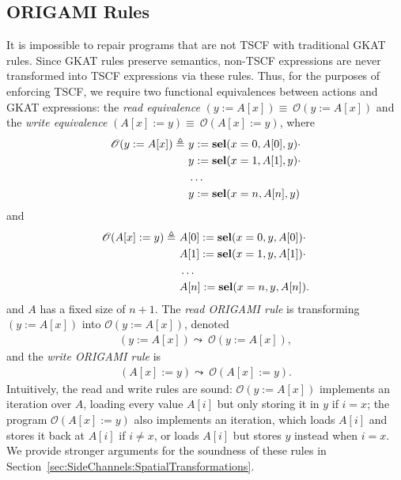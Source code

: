 \subsection{ORIGAMI Rules}
\label{sec:SideChannels:OrigamiRules}
It is impossible to repair programs that are not TSCF with traditional GKAT rules. Since GKAT rules preserve semantics, non-TSCF expressions are never transformed into TSCF expressions via these rules. 
Thus, for the purposes of enforcing TSCF, we require two functional equivalences between actions and GKAT expressions: the \emph{read equivalence} $(y:=A[x])\equiv\ \mathscr{O}(y:=A[x])$ and the \emph{write equivalence} $(A[x]:=y)\equiv\ \mathscr{O}(A[x]:=y)$, where 
\begin{align*}
    \mathscr{O}(y:=A[x])\triangleq\  
    &y:=\textbf{sel}(x=0,A[0],y)\cdot \\
    &y:=\textbf{sel}(x=1,A[1],y)\cdot \\
    &\ldots\\
    &y:=\textbf{sel}(x=n,A[n],y)
\end{align*} and 
\begin{align*}
    \mathscr{O}(A[x]:=y)\triangleq\  
    &A[0]:=\textbf{sel}(x=0,y,A[0])\cdot \\
    &A[1]:=\textbf{sel}(x=1,y,A[1])\cdot \\
    &\ldots\\
    &A[n]:=\textbf{sel}(x=n,y,A[n]).
\end{align*}
and $A$ has a fixed size of $n+1$. The \emph{read ORIGAMI rule} is transforming $(y:=A[x])$ into $\mathscr{O}(y:=A[x])$, denoted 
\begin{align}
    (y:=A[x])\leadsto\ \mathscr{O}(y:=A[x]),
\end{align}
and the \emph{write ORIGAMI rule} is 
\begin{align}
    (A[x]:=y)\leadsto\ \mathscr{O}(A[x]:=y).
\end{align}
Intuitively, the read and write rules are sound: $\mathscr{O}(y:=A[x])$ implements an iteration over $A$, loading every value $A[i]$ but only storing it in $y$ if $i=x$; the program $\mathscr{O}(A[x]:=y)$ also implements an iteration, which loads $A[i]$ and stores it back at $A[i]$ if $i\neq x$, or loads $A[i]$ but stores $y$ instead when $i=x$. We provide stronger arguments for the soundness of these rules in Section~\ref{sec:SideChannels:SpatialTransformations}.

